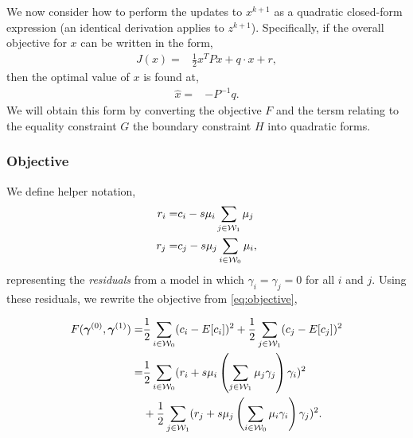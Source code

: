 We now consider how to perform the updates to $x^{k+1}$ as a quadratic closed-form expression (an identical derivation applies to $z^{k+1}$). Specifically, if the overall objective for $x$ can be written in the form,
\begin{align}
J(x) = & \frac{1}{2}x^T P x + q \cdot x + r,
\end{align}
then the optimal value of $x$ is found at,
\begin{align}
\hat{x} = & -P^{-1} q.
\end{align}
We will obtain this form by converting the objective $F$ and the tersm relating to the equality constraint $G$ the boundary constraint $H$ into quadratic forms.

\subsubsection{Objective}
We define helper notation,
\begin{align}
r_i = & c_i - s\mu_i \sum_{j\in {\ensuremath{\mathcal{W}}}_1}\mu_j\\
r_j = & c_j - s\mu_j \sum_{i\in {\ensuremath{\mathcal{W}}}_0}\mu_i,
\end{align}
representing the \emph{residuals} from a model in which $\gamma_i = \gamma_j = 0$ for all $i$ and $j$. Using these residuals, we rewrite the objective from \autoref{eq:objective},
\begin{small}
\begin{align}
F(\bm{\gamma}^{(0)},\bm{\gamma}^{(1)}) = & \frac{1}{2}\sum_{i\in \mathcal{W}_0}(c_i - E[c_i])^2 + \frac{1}{2}\sum_{j\in {\ensuremath{\mathcal{W}}}_1}(c_j - E[c_j])^2\\
\notag = &\frac{1}{2}\sum_{i\in {\ensuremath{\mathcal{W}}}_0}(r_i + s \mu_i \left(\sum_{j\in {\ensuremath{\mathcal{W}}}_1} \mu_j \gamma_j \right) \gamma_i )^2\\
& + \frac{1}{2}\sum_{j\in {\ensuremath{\mathcal{W}}}_1}(r_j + s \mu_j \left(\sum_{i\in {\ensuremath{\mathcal{W}}}_0} \mu_i \gamma_i \right) \gamma_j )^2.
\end{align}
\end{small}

